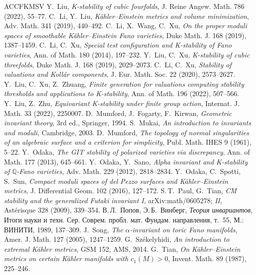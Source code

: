 \documentclass[11pt,a4paper]{article}
\theoremstyle{plain}
\theoremstyle{definition}
\theoremstyle{remark}
\newcommand{\Q}{\mathbb{Q}}
\begin{document}
\begin{thebibliography}{ACCFKMSV}
 Y.~Liu, \emph{K-stability of cubic fourfolds}, J. Reine Angew. Math. 786 (2022), 55--77.
 C.~Li, Y.~Liu, \emph{K\"ahler--Einstein metrics and volume minimization}, Adv. Math. 341 (2019), 440--492.
 C.~Li, X.~Wang, C.~Xu, \emph{On the proper moduli spaces of smoothable K\"ahler--Einstein Fano varieties}, Duke Math. J. 168 (2019), 1387--1459.
 C.~Li, C.~Xu, \emph{Special test configuration and K-stability of Fano varieties}, Ann. of Math. 180 (2014), 197--232.
 Y.~Liu, C.~Xu, \emph{K-stability of cubic threefolds}, Duke Math. J. 168 (2019), 2029--2073.
 C.~Li, C.~Xu, \emph{Stability of valuations and Koll\'ar components}, J. Eur. Math. Soc. 22 (2020), 2573--2627.
 Y.~Liu, C.~Xu, Z.~Zhuang, \emph{Finite generation for valuations computing stability thresholds and applications to K-stability}, Ann. of Math. 196 (2022), 507--566.
 Y.~Liu, Z.~Zhu, \emph{Equivariant K-stability under finite group action}, Internat. J. Math. 33 (2022), 2250007.
 D.~Mumford, J.~Fogarty, F.~Kirwan, \emph{Geometric invariant theory}, 3rd ed., Springer, 1994.
 S.~Mukai, \emph{An introduction to invariants and moduli}, Cambridge, 2003.
 D.~Mumford, \emph{The topology of normal singularities of an algebraic surface and a criterion for simplicity}, Publ. Math. IHES 9 (1961), 5--22.
 Y.~Odaka, \emph{The GIT stability of polarized varieties via discrepancy}, Ann. of Math. 177 (2013), 645--661.
 Y.~Odaka, Y.~Sano, \emph{Alpha invariant and K-stability of $\Q$-Fano varieties}, Adv. Math. 229 (2012), 2818--2834.
 Y.~Odaka, C.~Spotti, S.~Sun, \emph{Compact moduli spaces of del Pezzo surfaces and K\"ahler--Einstein metrics}, J. Differential Geom. 102 (2016), 127--172.
 S.\,T.~Paul, G.~Tian, \emph{CM stability and the generalized Futaki invariant I}, arXiv:math/0605278; \emph{II}, Ast\'erisque 328 (2009), 339--354.
 В.\,Л.~Попов, Э.\,Б.~Винберг, \emph{Теория инвариантов}, Итоги науки и техн. Сер. Соврем. пробл. мат. Фундам. направления, т.~55, М.: ВИНИТИ, 1989, 137--309.
 J.~Song, \emph{The $\alpha$-invariant on toric Fano manifolds}, Amer. J. Math. 127 (2005), 1247--1259.
 G.~Sz\'ekelyhidi, \emph{An introduction to extremal K\"ahler metrics}, GSM 152, AMS, 2014.
 G.~Tian, \emph{On K\"ahler--Einstein metrics on certain K\"ahler manifolds with $c_1(M)>0$}, Invent. Math. 89 (1987), 225--246.

\end{thebibliography}
\end{document}
